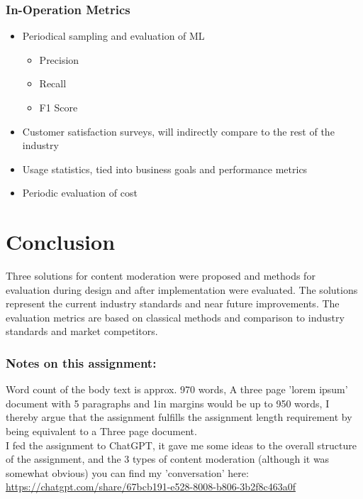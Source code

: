 \documentclass[
	letterpaper, %
	12pt, %
	unnumberedsections, %
	twoside, %
]{LTJournalArticle}
\begin{document}
\subsubsection*{In-Operation Metrics}
\begin{itemize}
	\item Periodical sampling and evaluation of ML
	      \begin{itemize}
		      \item Precision
		      \item Recall
		      \item F1 Score
	      \end{itemize}
	\item Customer satisfaction surveys, will indirectly compare to the rest of the industry
	\item Usage statistics, tied into business goals and performance metrics
	\item Periodic evaluation of cost
\end{itemize}




\section*{Conclusion}
Three solutions for content moderation were proposed and methods for evaluation during design and after implementation were evaluated. The solutions represent the current industry standards and near future improvements. The evaluation metrics are based on classical methods and comparison to industry standards and market competitors.


\printbibliography %

\subsubsection*{Notes on this assignment:}
Word count of the body text is approx. 970 words, A three page 'lorem ipsum' document with 5 paragraphs and 1in margins would be up to 950 words, I thereby argue that the assignment fulfills the assignment length requirement by being equivalent to a Three page document. \\
I fed the assignment to ChatGPT, it gave me some ideas to the overall structure of the assignment, and the 3 types of content moderation (although it was somewhat obvious) you can find my 'conversation' here: \url{https://chatgpt.com/share/67bcb191-e528-8008-b806-3b2f8c463a0f}


%
%
%
\end{document}
